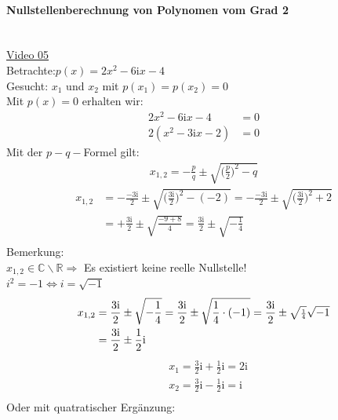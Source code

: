 \paragraph{Nullstellenberechnung von Polynomen vom Grad 2}$  $\vspace*{3mm}\\
\href{https://youtu.be/l27JVKX78Kc}{Video 05}\\
Betrachte:\;\;$ p(x)=2x^2-6\mathrm{i}x-4 $\\
Gesucht: $ x_1 $ und $x_2$ mit $ p(x_1)=p(x_2)=0 $\vspace*{2mm}\\
Mit $ p(x)=0 $ erhalten wir:\\
\begin{align*}
2x^2-6\mathrm{i}x-4&=0\\
2(x^2-3\mathrm{i}x-2)&=0
\end{align*}
Mit der $ p-q- $Formel gilt:\\
\begin{align*}
x_{1,2}=-\frac{p}{q}\pm\sqrt{\bigg(\frac{p}{2}\bigg)^2-q}
\end{align*}
\begin{align*}
x_{1,2}&=-\frac{-3\mathrm{i}}{2}\pm\sqrt{\bigg(\frac{3\mathrm{i}}{2}\bigg)^2-(-2)}=-\frac{-3\mathrm{i}}{2}\pm\sqrt{\bigg(\frac{3\mathrm{i}}{2}\bigg)^2+2}\\
&=+\frac{3\mathrm{i}}{2}\pm\sqrt{\frac{-9+8}{4}}=\frac{3\mathrm{i}}{2}\pm\sqrt{-\frac{1}{4}}\\
\end{align*}
Bemerkung:\\
$ x_{1,2} \in  \mathbb{C}\backslash \mathbb{R}\Rightarrow$ Es existiert keine reelle Nullstelle!\\
$ i^2=-1\Leftrightarrow i=\sqrt{-1} $\\
\begin{align*}
x_{1,2}&=\frac{3\mathrm{i}}{2}\pm\sqrt{-\frac{1}{4}}=\frac{3\mathrm{i}}{2}\pm\sqrt{\frac{1}{4}\cdot(-1)}=\frac{3\mathrm{i}}{2}\pm\sqrt{\genfrac{}{}{}{2}{1}{4 }}\sqrt{-1}\\
&=\frac{3\mathrm{i}}{2}\pm\frac{1}{2}\mathrm{i}\\
\end{align*}
\begin{align*}
&x_1=\frac{3}{2}\mathrm{i}+\frac{1}{2}\mathrm{i}=2\mathrm{i}\\
&x_2=\frac{3}{2}\mathrm{i}-\frac{1}{2}\mathrm{i}=\mathrm{i}\\
\end{align*}
Oder mit quatratischer Ergänzung:\\
